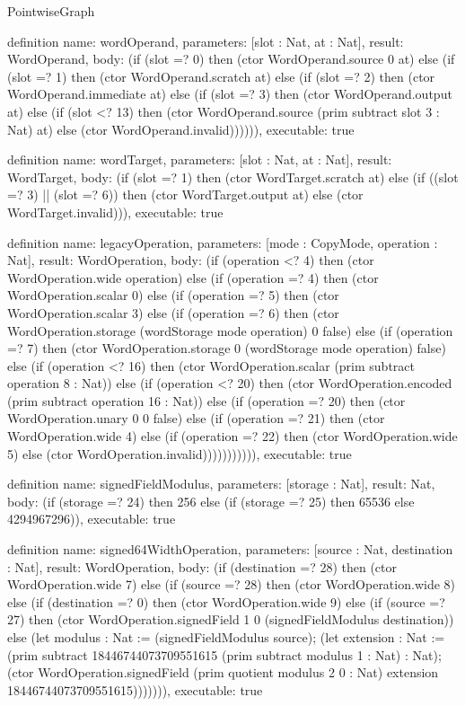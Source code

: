\begin{lexlean}{PointwiseGraph}
\begin{semanticmodule}
definition{
  name: wordOperand,
  parameters: [slot : Nat, at : Nat],
  result: WordOperand,
  body: (if (slot =? 0) then (ctor WordOperand.source 0 at) else (if (slot =? 1) then (ctor WordOperand.scratch at) else (if (slot =? 2) then (ctor WordOperand.immediate at) else (if (slot =? 3) then (ctor WordOperand.output at) else (if (slot <? 13) then (ctor WordOperand.source (prim subtract slot 3 : Nat) at) else (ctor WordOperand.invalid)))))),
  executable: true
}

definition{
  name: wordTarget,
  parameters: [slot : Nat, at : Nat],
  result: WordTarget,
  body: (if (slot =? 1) then (ctor WordTarget.scratch at) else (if ((slot =? 3) || (slot =? 6)) then (ctor WordTarget.output at) else (ctor WordTarget.invalid))),
  executable: true
}

definition{
  name: legacyOperation,
  parameters: [mode : CopyMode, operation : Nat],
  result: WordOperation,
  body: (if (operation <? 4) then (ctor WordOperation.wide operation) else (if (operation =? 4) then (ctor WordOperation.scalar 0) else (if (operation =? 5) then (ctor WordOperation.scalar 3) else (if (operation =? 6) then (ctor WordOperation.storage (wordStorage mode operation) 0 false) else (if (operation =? 7) then (ctor WordOperation.storage 0 (wordStorage mode operation) false) else (if (operation <? 16) then (ctor WordOperation.scalar (prim subtract operation 8 : Nat)) else (if (operation <? 20) then (ctor WordOperation.encoded (prim subtract operation 16 : Nat)) else (if (operation =? 20) then (ctor WordOperation.unary 0 0 false) else (if (operation =? 21) then (ctor WordOperation.wide 4) else (if (operation =? 22) then (ctor WordOperation.wide 5) else (ctor WordOperation.invalid))))))))))),
  executable: true
}

definition{
  name: signedFieldModulus,
  parameters: [storage : Nat],
  result: Nat,
  body: (if (storage =? 24) then 256 else (if (storage =? 25) then 65536 else 4294967296)),
  executable: true
}

definition{
  name: signed64WidthOperation,
  parameters: [source : Nat, destination : Nat],
  result: WordOperation,
  body: (if (destination =? 28) then (ctor WordOperation.wide 7) else
    (if (source =? 28) then (ctor WordOperation.wide 8) else
    (if (destination =? 0) then (ctor WordOperation.wide 9) else
    (if (source =? 27) then (ctor WordOperation.signedField 1 0 (signedFieldModulus destination)) else
    (let modulus : Nat := (signedFieldModulus source);
      (let extension : Nat := (prim subtract 18446744073709551615 (prim subtract modulus 1 : Nat) : Nat);
        (ctor WordOperation.signedField (prim quotient modulus 2 0 : Nat) extension 18446744073709551615))))))),
  executable: true
}


\end{semanticmodule}
\end{lexlean}
